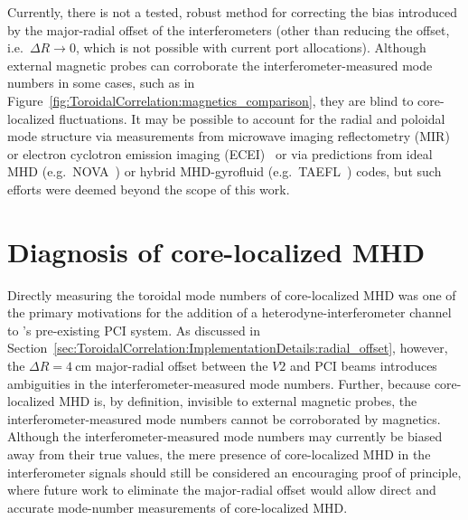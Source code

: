 Currently, there is not a tested, robust method
for correcting the bias introduced by
the major-radial offset of the interferometers
(other than reducing the offset, i.e.\ $\Delta R \rightarrow 0$,
which is not possible with current port allocations).
Although external magnetic probes can corroborate
the interferometer-measured mode numbers in some cases,
such as in Figure~\ref{fig:ToroidalCorrelation:magnetics_comparison},
they are blind to core-localized fluctuations.
It may be possible to account for the radial and poloidal mode structure
via measurements from
microwave imaging reflectometry (MIR)~\cite{muscatello_rsi14} or
electron cyclotron emission imaging (ECEI)~\cite{tobias_rsi10}
or via predictions from
ideal MHD (e.g.\ NOVA~\cite{cheng_jcp87, cheng_pr92})
or hybrid MHD-gyrofluid (e.g.\ TAEFL~\cite{spong_pfb92, spong_ps92}) codes,
but such efforts were deemed beyond the scope of this work.


\section{Diagnosis of core-localized MHD}
\label{sec:ToroidalCorrelation:CoreLocalized}
Directly measuring the toroidal mode numbers of core-localized MHD
was one of the primary motivations for the addition
of a heterodyne-interferometer channel to \diiid's pre-existing PCI system.
As discussed in
Section~\ref{sec:ToroidalCorrelation:ImplementationDetails:radial_offset},
however, the $\Delta R = \SI{4}{\centi\meter}$ major-radial offset
between the $V2$ and PCI beams
introduces ambiguities in the interferometer-measured mode numbers.
Further, because core-localized MHD is, by definition,
invisible to external magnetic probes,
the interferometer-measured mode numbers
cannot be corroborated by magnetics.
Although the interferometer-measured mode numbers
may currently be biased away from their true values,
the mere presence of core-localized MHD in the interferometer signals
should still be considered an encouraging proof of principle,
where future work to eliminate the major-radial offset
would allow direct and accurate
mode-number measurements of core-localized MHD.

